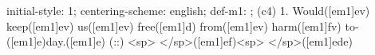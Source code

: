 initial-style: 1;
centering-scheme: english;
def-m1: \grealign;
(c4) 1. Would([em1]ev) keep([em1]ev) us([em1]ev) free([em1]d) from([em1]ev) harm([em1]fv) to-([em1]e)day.([em1]e) (::) <sp> </sp>([em1]ef)<sp> </sp>([em1]ede)